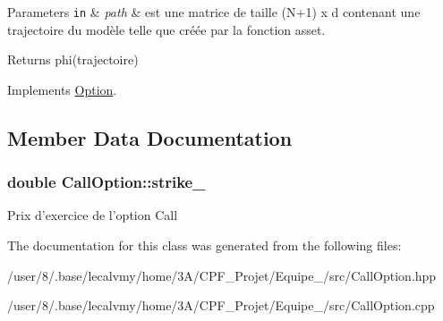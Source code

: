 \begin{DoxyParams}[1]{Parameters}
\mbox{\tt in}  & {\em path} & est une matrice de taille (N+1) x d contenant une trajectoire du modèle telle que créée par la fonction asset. \\
\hline
\end{DoxyParams}
\begin{DoxyReturn}{Returns}
phi(trajectoire) 
\end{DoxyReturn}


Implements \hyperlink{classOption_abe90882a11f5436077425249e3f32204}{Option}.



\subsection{Member Data Documentation}
\hypertarget{classCallOption_a5158e7f6be0b959b51e2e92172a49ebf}{
\subsubsection[{strike\-\_\-}]{\setlength{\rightskip}{0pt plus 5cm}double Call\-Option\-::strike\-\_\-}}\label{classCallOption_a5158e7f6be0b959b51e2e92172a49ebf}
Prix d'exercice de l'option Call 

The documentation for this class was generated from the following files\-:\begin{DoxyCompactItemize}
\item 
/user/8/.\-base/lecalvmy/home/3\-A/\-C\-P\-F\-\_\-\-Projet/\-Equipe\-\_/src/Call\-Option.\-hpp\item 
/user/8/.\-base/lecalvmy/home/3\-A/\-C\-P\-F\-\_\-\-Projet/\-Equipe\-\_/src/Call\-Option.\-cpp\end{DoxyCompactItemize}
